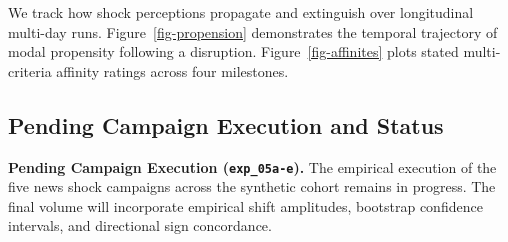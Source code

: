 We track how shock perceptions propagate and extinguish over longitudinal multi-day runs. Figure~\ref{fig-propension} demonstrates the temporal trajectory of modal propensity following a disruption. Figure~\ref{fig-affinites} plots stated multi-criteria affinity ratings across four milestones.


\subsection{Pending Campaign Execution and Status}

\textbf{Pending Campaign Execution (\texttt{exp\_05a-e}).} The empirical execution of the five news shock campaigns across the synthetic cohort remains in progress. The final volume will incorporate empirical shift amplitudes, bootstrap confidence intervals, and directional sign concordance.
